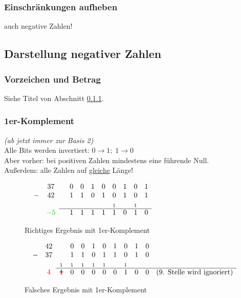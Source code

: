 \documentclass[10pt,a4paper]{scrartcl}
\newcommand\hcancel[2][black]{\setbox0=\hbox{$#2$}%
	\rlap{\raisebox{.45\ht0}{\textcolor{#1}{\rule{\wd0}{1pt}}}}#2}
\begin{document}
\subsubsection*{Einschränkungen aufheben}
\hspace*{2em}
auch negative Zahlen!
\\
\subsection{Darstellung negativer Zahlen}
 \subsubsection{Vorzeichen und Betrag}
 \label{section:vorzeichen}
 Siehe Titel von Abschnitt \ref{section:vorzeichen}.
\subsubsection{1er-Komplement}
	\textit{(ab jetzt immer zur Basis 2)}\\
	Alle Bits werden invertiert: $ 0 \rightarrow 1; \; 1\rightarrow 0 $\\
	Aber vorher: bei positiven Zahlen mindestens eine führende Null.\\
	Außerdem: alle Zahlen auf \underline{gleiche} Länge!
\begin{figure}
	$$
\begin{array}{rc}
& 37 \\
-  & 42 \\
& \\
 & \textcolor{green!80!black}{-5}
\end{array}
\begin{array}{cccccccccl}
& 0 & 0 & 1 & 0 & 0 & 1 & 0 & 1 &\\
& 1 & 1 & 0 & 1 & 0 & 1 & 0 & 1 &\\
 &  &  &  &    & _1 &  & _1 &  &\\ \cline{1-9}
   & 1 & 1 & 1 & 1 & 1 & 0 & 1 & 0 & \text{\phantom{(9. Stelle wird ignoriert)}}
\end{array}
$$
\caption{Richtiges Ergebnis mit 1er-Komplement}
\end{figure}
\begin{figure}[h!]
	$$
\begin{array}{rc}
	& 42 \\
 -  & 37 \\
    & \\
    & \textcolor{red}{4}
\end{array}
\begin{array}{cccccccccl}
       & 0 & 0 & 1 & 0 & 1 & 0 & 1 & 0 &\\
       & 1 & 1 & 0 & 1 & 1 & 0 & 1 & 0 &\\
 _1 & _1 & _1 & _1 & _1 &     & _1 &    & &\\ \hline
\hcancel[red]{1}  & 0 & 0 & 0 & 0 & 0 & 1 & 0 & 0 & \text{(9. Stelle wird ignoriert)}
\end{array}
$$
\caption{Falsches Ergebnis mit 1er-Komplement}
\end{figure}
\end{document}
